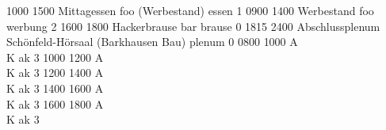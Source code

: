 \documentclass[a5paper,9pt]{scrreprt}
\begin{document}
\begin{timetable}
   {1000} {1500} {Mittagessen}      {foo (Werbestand)} {} {essen}   {1}
   {0900} {1400} {Werbestand}       {foo}              {} {werbung} {2}
   {1600} {1800} {Hackerbrause}     {bar}              {} {brause}  {0}
   {1815} {2400} {Abschlussplenum}  {Schönfeld-Hörsaal (Barkhausen Bau)} {} {plenum}  {0}
   {0800} {1000} {\hfill A\\ \hfill K} {}              {} {ak}      {3}
   {1000} {1200} {\hfill A\\ \hfill K} {}              {} {ak}      {3}
   {1200} {1400} {\hfill A\\ \hfill K} {}              {} {ak}      {3}
   {1400} {1600} {\hfill A\\ \hfill K} {}              {} {ak}      {3}
   {1600} {1800} {\hfill A\\ \hfill K} {}              {} {ak}      {3}
\end{timetable}
\end{document}
